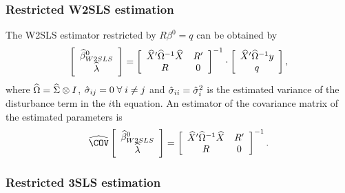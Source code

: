 \subsubsection{Restricted W2SLS estimation}

The W2SLS estimator restricted by $R \beta^0 = q$ can be obtained by
\begin{equation}
   \left[ \begin{array}{c}
      \widehat{\beta}^0_{W2SLS} \\ \widehat{\lambda}
   \end{array} \right]
   =
   \left[ \begin{array}{cc}
      \widehat{X}' \widehat{\Omega}^{-1} \widehat{X} & R' \\
      R & 0
   \end{array} \right]^{-1}
   \cdot
   \left[ \begin{array}{c}
      \widehat{X}' \widehat{\Omega}^{-1} y \\ q
   \end{array} \right] ,
\end{equation}
where $\widehat{\Omega} = \widehat{\Sigma} \otimes I$,
$\hat{\sigma}_{ij} = 0 \; \forall \; i \neq j$ and
$\hat{\sigma}_{ii} = \hat{\sigma}_i^2$ is the estimated variance
of the disturbance term in the $i$th equation.
An estimator of the covariance matrix of the estimated parameters is
\begin{equation}
   \COVHat
   \left[ \begin{array}{c}
      \widehat{\beta}^0_{W2SLS} \\ \widehat{\lambda}
   \end{array} \right] 
   = 
   \left[ \begin{array}{cc}
      \widehat{X}' \OHat^{-1} \widehat{X} & R' \\
      R & 0
   \end{array} \right]^{-1} .
\end{equation}


\subsubsection{Restricted 3SLS estimation}

